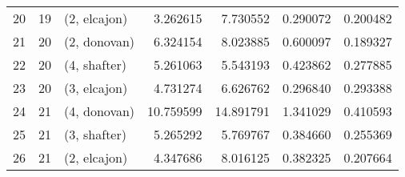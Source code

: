 \begin{tabular}{lllrrrr}
20 &    19 &  (2, elcajon) &   3.262615 &   7.730552 &   0.290072 &  0.200482 \\
21 &    20 &  (2, donovan) &   6.324154 &   8.023885 &   0.600097 &  0.189327 \\
22 &    20 &  (4, shafter) &   5.261063 &   5.543193 &   0.423862 &  0.277885 \\
23 &    20 &  (3, elcajon) &   4.731274 &   6.626762 &   0.296840 &  0.293388 \\
24 &    21 &  (4, donovan) &  10.759599 &  14.891791 &   1.341029 &  0.410593 \\
25 &    21 &  (3, shafter) &   5.265292 &   5.769767 &   0.384660 &  0.255369 \\
26 &    21 &  (2, elcajon) &   4.347686 &   8.016125 &   0.382325 &  0.207664 \\
\bottomrule
\end{tabular}
